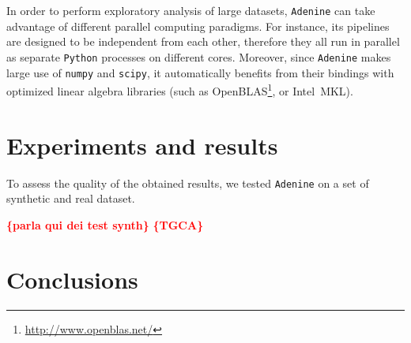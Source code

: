 \documentclass[twoside,11pt]{article}
\makeatletter
\newcommand{\ade}{\texttt{Adenine}\@\xspace}
\newcommand{\py}{\texttt{Python}\@\xspace}
\newcommand{\todo}[1]{\textcolor{red}{{\bf \{#1\}}}} %
\makeatother
\begin{document}
In order to perform exploratory analysis of large datasets, \ade can take advantage of different parallel computing paradigms. For instance, its pipelines are designed to be independent from each other, therefore they all run in parallel as separate \py processes on different cores. Moreover, since \ade makes large use of \texttt{numpy} and \texttt{scipy}, it automatically benefits from their bindings with optimized linear algebra libraries (such as OpenBLAS\footnote{\href{http://www.openblas.net/}{http://www.openblas.net/}}, or Intel\textsuperscript{\textregistered}~MKL).

\section{Experiments and results}
To assess the quality of the obtained results, we tested \ade on a set of synthetic and real dataset.

\todo{parla qui dei test synth}
\todo{TGCA}

\section{Conclusions}



\end{document}
